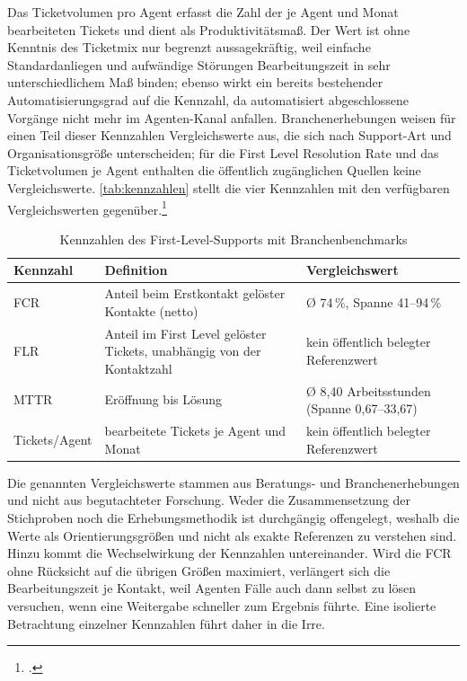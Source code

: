 Das Ticketvolumen pro Agent erfasst die Zahl der je Agent und Monat bearbeiteten Tickets und dient als Produktivit\"atsma{\ss}. Der Wert ist ohne Kenntnis des Ticketmix nur begrenzt aussagekr\"aftig, weil einfache Standardanliegen und aufw\"andige St\"orungen Bearbeitungszeit in sehr unterschiedlichem Ma{\ss} binden; ebenso wirkt ein bereits bestehender Automatisierungsgrad auf die Kennzahl, da automatisiert abgeschlossene Vorg\"ange nicht mehr im Agenten-Kanal anfallen. Branchenerhebungen weisen f\"ur einen Teil dieser Kennzahlen Vergleichswerte aus, die sich nach Support-Art und Organisationsgr\"o{\ss}e unterscheiden; f\"ur die First Level Resolution Rate und das Ticketvolumen je Agent enthalten die \"offentlich zug\"anglichen Quellen keine Vergleichswerte. \autoref{tab:kennzahlen} stellt die vier Kennzahlen mit den verf\"ugbaren Vergleichswerten gegen\"uber.\footcites[Vgl.][S.~5]{Rumburg2011}[][o.~S.]{Rumburg2018}

\begin{table}[H]
	\centering
	\caption{Kennzahlen des First-Level-Supports mit Branchenbenchmarks}
	\label{tab:kennzahlen}
	\begin{tabularx}{\textwidth}{@{}lXX@{}}
		\toprule
		Kennzahl & Definition & Vergleichswert \\
		\midrule
		FCR & Anteil beim Erstkontakt gel\"oster Kontakte (netto) & \O{} 74\,\%, Spanne 41--94\,\% \\
		FLR & Anteil im First Level gel\"oster Tickets, unabh\"angig von der Kontaktzahl & kein \"offentlich belegter Referenzwert \\
		MTTR & Er\"offnung bis L\"osung & \O{} 8,40 Arbeitsstunden (Spanne 0,67--33,67) \\
		Tickets/Agent & bearbeitete Tickets je Agent und Monat & kein \"offentlich belegter Referenzwert \\
		\bottomrule
	\end{tabularx}
	\par\vspace{0.4em}{\footnotesize Quelle: In Anlehnung an Rumburg (2011), S.~5; Rumburg (2018); Irizarry (2021).}
\end{table}

Die genannten Vergleichswerte stammen aus Beratungs- und Branchenerhebungen und nicht aus begutachteter Forschung. Weder die Zusammensetzung der Stichproben noch die Erhebungsmethodik ist durchg\"angig offengelegt, weshalb die Werte als Orientierungsgr\"o{\ss}en und nicht als exakte Referenzen zu verstehen sind. Hinzu kommt die Wechselwirkung der Kennzahlen untereinander. Wird die FCR ohne R\"ucksicht auf die \"ubrigen Gr\"o{\ss}en maximiert, verl\"angert sich die Bearbeitungszeit je Kontakt, weil Agenten F\"alle auch dann selbst zu l\"osen versuchen, wenn eine Weitergabe schneller zum Ergebnis f\"uhrte. Eine isolierte Betrachtung einzelner Kennzahlen f\"uhrt daher in die Irre.

